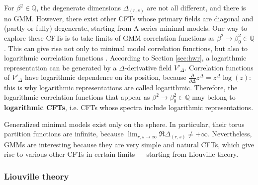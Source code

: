 \documentclass[12pt, a4paper]{article}
\newcommand{\myindex}[1]{\textbf{\boldmath #1}}
\begin{document}
For $\beta^2\in \mathbb{Q}$, the degenerate dimensions $\Delta_{(r,s)}$ are not all different, and there is no GMM. However, there exist other CFTs whose primary fields are diagonal and (partly or fully) degenerate, starting from A-series minimal models. One way to explore these CFTs is to take limits of GMM correlation functions as $\beta^2\to \beta^2_0\in \mathbb{Q}$. This can give rise not only to minimal model correlation functions, but also to logarithmic correlation functions \cite{rib18}. According to Section \ref{sec:hwr}, a logarithmic representation can be generated by a $\Delta$-derivative field $V'_\Delta$. Correlation functions of $V'_\Delta$ have logarithmic dependence on its position, because $\frac{\partial}{\partial \Delta} z^\Delta = z^\Delta \log(z)$: this is why logarithmic representations are called logarithmic. Therefore, the logarithmic correlation functions that appear as $\beta^2\to \beta^2_0\in \mathbb{Q}$ may belong to \myindex{logarithmic CFTs}, i.e. CFTs whose spectra include logarithmic representations.

Generalized minimal models exist only on the sphere. In particular, their torus partition functions are infinite, because $\lim_{r,s\to\infty} \Re\Delta_{(r,s)}\neq +\infty$. Nevertheless, GMMs are interesting because they are very simple and natural CFTs, which give rise to various other CFTs in certain limits --- starting from Liouville theory.

\subsubsection{Liouville theory}\label{sec:liou}
\end{document}
